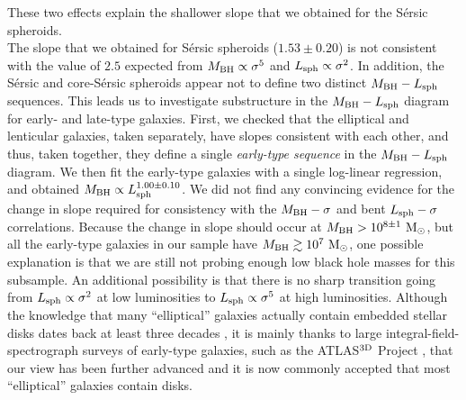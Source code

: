 \documentclass[preprint2]{emulateapj}
\begin{document}
These two effects explain the shallower slope that we obtained for the S\'ersic spheroids. \\
The slope that we obtained for S\'ersic spheroids ($1.53 \pm 0.20$) is not consistent with the value of $2.5$ 
expected from $M_{\rm BH} \propto \sigma^5$ and $L_{\rm sph} \propto \sigma^2$. 
In addition, the S\'ersic and core-S\'ersic spheroids appear not to define two distinct $M_{\rm BH} - L_{\rm sph}$ sequences. 
This leads us to investigate substructure in the $M_{\rm BH} - L_{\rm sph}$ diagram for early- and late-type galaxies.
First, we checked that the elliptical and lenticular galaxies, taken separately, have slopes consistent with each other, 
and thus, taken together, they define a single \emph{early-type sequence} in the $M_{\rm BH} - L_{\rm sph}$ diagram. 
We then fit the early-type galaxies with a single log-linear regression, 
and obtained $M_{\rm BH} \propto L_{\rm sph}^{1.00 \pm 0.10}$. 
We did not find any convincing evidence for the change in slope required for consistency 
with the $M_{\rm BH} - \sigma$ and bent $L_{\rm sph} - \sigma$ correlations. 
Because the change in slope should occur at $M_{\rm BH} > 10^{8 \pm 1}\rm~M_\odot$, 
but all the early-type galaxies in our sample have $M_{\rm BH} \gtrsim 10^7\rm~M_\odot$, 
one possible explanation is that we are still not probing enough low black hole masses for this subsample.
An additional possibility is that there is no sharp transition going from $L_{\rm sph} \propto \sigma^2$ at low luminosities 
to $L_{\rm sph} \propto \sigma^5$ at high luminosities. 
Although the knowledge that many ``elliptical'' galaxies actually contain embedded stellar disks dates back  
at least three decades  
\citep{capaccioli1987,carter1987,rixwhite1990,bender1990,scorzabender1990,nieto1991,rixwhite1992,scorzabender1995},
it is mainly thanks to large integral-field-spectrograph surveys of early-type galaxies, such as the ATLAS$^{\rm 3D}$ Project \citep{cappellari2011}, 
that our view has been further advanced 
and it is now commonly accepted that most ``elliptical'' galaxies contain disks. 
\end{document}
